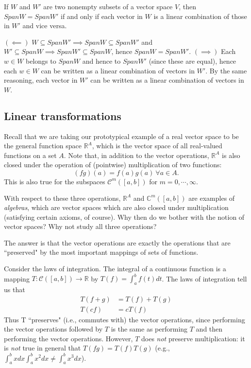 \documentclass[12pt,letterpaper,reqno]{article}
\numberwithin{equation}{section}
\newcommand{\ti}[1]{\textit{#1}}
\begin{document}
\begin{thm}
	If $W$ and $W'$ are two nonempty subsets of a vector space $V$, then $SpanW=SpanW'$ if and only if each vector in $W$ is a linear combination of those in $W'$ and vice versa.
\end{thm}

\begin{pf}
$(\impliedby)$ $W \subseteq Span W' \implies Span W \subseteq Span W'$ and $W' \subseteq Span W \implies Span W' \subseteq Span W$, hence $Span W = SpanW'$. $(\implies)$ Each $w \in W$ belongs to $Span W$ and hence to $SpanW'$ (since these are equal), hence each $w \in W$ can be written as a linear combination of vectors in $W'$. By the same reasoning, each vector in $W'$ can be written as a linear combination of vectors in $W$.	
\end{pf}

\subsection{Linear transformations}
Recall that we are taking our prototypical example of a real vector space to be the general function space $\mathbb{R}^A$, which is the vector space of all real-valued functions on a set $A$. Note that, in addition to the vector operations, $\mathbb{R}^A$ is also closed under the operation of (pointwise) multiplication of two functions: $$(fg)(a)=f(a)g(a) \ \forall a \in A.$$
This is also true for the subspaces $\mathscr{C}^m([a,b])$ for $m=0,\cdots,\infty$. 

With respect to these three operations, $\mathbb{R}^A$ and $\mathbb{C}^m([a,b])$ are examples of \emph{algebras}, which are vector spaces which are also closed under multiplication (satisfying certain axioms, of course). Why then do we bother with the notion of vector spaces? Why not study all three operations?

The answer is that the vector operations are exactly the operations that are ``preserved" by the most important mappings of sets of functions. 

\begin{example}
Consider the laws of integration. The integral of a continuous function is a mapping $T:\mathscr{C}([a,b]) \to \mathbb{R}$ by $T(f)=\int_{a}^bf(t)dt$. The laws of integration tell us that
\begin{align*}
	T(f+g)&=T(f)+T(g) \\
	T(cf)&=cT(f)
\end{align*}
Thus T ``preserves" (i.e., commutes with) the vector operations, since performing the vector operations followed by $T$ is the same as performing $T$ and then performing the vector operations. However, $T$ does \ti{not} preserve multiplication: it is \ti{not} true in general that $T(fg)=T(f)T(g)$ (e.g., $\int_a^b x dx \int_a^b x^2 dx\neq \int_a^b x^3 dx$).
\end{example}
\end{document}
